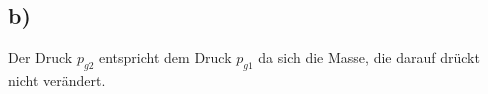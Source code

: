 

\subsection*{b)}

Der Druck $p_{g2}$ entspricht dem Druck $p_{g1}$ da sich die Masse, die darauf drückt nicht verändert.